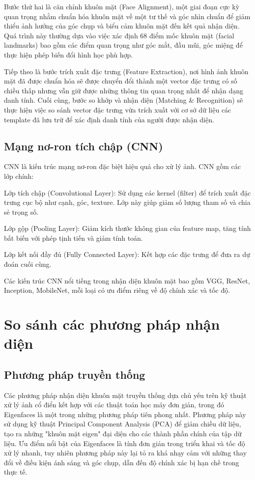 \documentclass[12pt,a4paper]{report}
\begin{document}
Bước thứ hai là căn chỉnh khuôn mặt (Face Alignment), một giai đoạn cực kỳ quan trọng nhằm chuẩn hóa khuôn mặt về một tư thế và góc nhìn chuẩn để giảm thiểu ảnh hưởng của góc chụp và biểu cảm khuôn mặt đến kết quả nhận diện. Quá trình này thường dựa vào việc xác định 68 điểm mốc khuôn mặt (facial landmarks) bao gồm các điểm quan trọng như góc mắt, đầu mũi, góc miệng để thực hiện phép biến đổi hình học phù hợp.

Tiếp theo là bước trích xuất đặc trưng (Feature Extraction), nơi hình ảnh khuôn mặt đã được chuẩn hóa sẽ được chuyển đổi thành một vector đặc trưng có số chiều thấp nhưng vẫn giữ được những thông tin quan trọng nhất để nhận dạng danh tính. Cuối cùng, bước so khớp và nhận diện (Matching & Recognition) sẽ thực hiện việc so sánh vector đặc trưng vừa trích xuất với cơ sở dữ liệu các template đã lưu trữ để xác định danh tính của người được nhận diện.

\subsection{Mạng nơ-ron tích chập (CNN)}
CNN là kiến trúc mạng nơ-ron đặc biệt hiệu quả cho xử lý ảnh. CNN gồm các lớp chính:

Lớp tích chập (Convolutional Layer): Sử dụng các kernel (filter) để trích xuất đặc trưng cục bộ như cạnh, góc, texture. Lớp này giúp giảm số lượng tham số và chia sẻ trọng số.

Lớp gộp (Pooling Layer): Giảm kích thước không gian của feature map, tăng tính bất biến với phép tịnh tiến và giảm tính toán.

Lớp kết nối đầy đủ (Fully Connected Layer): Kết hợp các đặc trưng để đưa ra dự đoán cuối cùng.

Các kiến trúc CNN nổi tiếng trong nhận diện khuôn mặt bao gồm VGG, ResNet, Inception, MobileNet, mỗi loại có ưu điểm riêng về độ chính xác và tốc độ.

\section{So sánh các phương pháp nhận diện}
\subsection{Phương pháp truyền thống}
Các phương pháp nhận diện khuôn mặt truyền thống dựa chủ yếu trên kỹ thuật xử lý ảnh cổ điển kết hợp với các thuật toán học máy đơn giản, trong đó Eigenfaces là một trong những phương pháp tiên phong nhất. Phương pháp này sử dụng kỹ thuật Principal Component Analysis (PCA) để giảm chiều dữ liệu, tạo ra những "khuôn mặt eigen" đại diện cho các thành phần chính của tập dữ liệu. Ưu điểm nổi bật của Eigenfaces là tính đơn giản trong triển khai và tốc độ xử lý nhanh, tuy nhiên phương pháp này lại tỏ ra khá nhạy cảm với những thay đổi về điều kiện ánh sáng và góc chụp, dẫn đến độ chính xác bị hạn chế trong thực tế.
\end{document}
